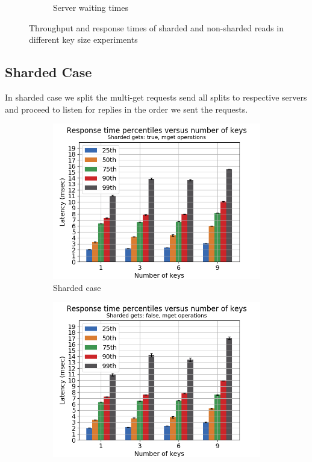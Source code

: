 \documentclass[11pt,a4paper]{article}
\begin{document}
\begin{figure}[h]
\begin{subfigure}{.5\textwidth}
  \caption{Server waiting times}
  \label{fig:gmg-mget-wtime_mw}
\end{subfigure}
\caption{Throughput and response times of sharded and non-sharded reads in different key size experiments}
\label{fig:gmg-mget_general}
\end{figure}

\subsection{Sharded Case} \label{sec:gmg-true}
In sharded case we split the multi-get requests send all splits to respective servers and proceed to listen for replies in the order we sent the requests.

\begin{figure}[h]
\begin{subfigure}{.5\textwidth}
  \centering
  \includegraphics[width=1.0\linewidth ,trim={5px 0px 20px 0px},clip]{img/plot/gmg-perc-true.png}
  \caption{Sharded case}
  \label{fig:gmg-perc-true}
\end{subfigure}%
\begin{subfigure}{.5\textwidth}
  \centering
  \includegraphics[width=1.0\linewidth ,trim={5px 0px 20px 0px},clip]{img/plot/gmg-perc-false.png}

\end{subfigure}
\end{figure}
\end{document}
